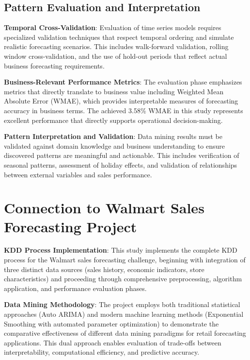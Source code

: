 \subsection{Pattern Evaluation and Interpretation}

\textbf{Temporal Cross-Validation}: Evaluation of time series models requires specialized validation techniques that respect temporal ordering and simulate realistic forecasting scenarios. This includes walk-forward validation, rolling window cross-validation, and the use of hold-out periods that reflect actual business forecasting requirements.

\textbf{Business-Relevant Performance Metrics}: The evaluation phase emphasizes metrics that directly translate to business value including Weighted Mean Absolute Error (WMAE), which provides interpretable measures of forecasting accuracy in business terms. The achieved 3.58\% WMAE in this study represents excellent performance that directly supports operational decision-making.

\textbf{Pattern Interpretation and Validation}: Data mining results must be validated against domain knowledge and business understanding to ensure discovered patterns are meaningful and actionable. This includes verification of seasonal patterns, assessment of holiday effects, and validation of relationships between external variables and sales performance.

\section{Connection to Walmart Sales Forecasting Project}

\textbf{KDD Process Implementation}: This study implements the complete KDD process for the Walmart sales forecasting challenge, beginning with integration of three distinct data sources (sales history, economic indicators, store characteristics) and proceeding through comprehensive preprocessing, algorithm application, and performance evaluation phases.

\textbf{Data Mining Methodology}: The project employs both traditional statistical approaches (Auto ARIMA) and modern machine learning methods (Exponential Smoothing with automated parameter optimization) to demonstrate the comparative effectiveness of different data mining paradigms for retail forecasting applications. This dual approach enables evaluation of trade-offs between interpretability, computational efficiency, and predictive accuracy.

